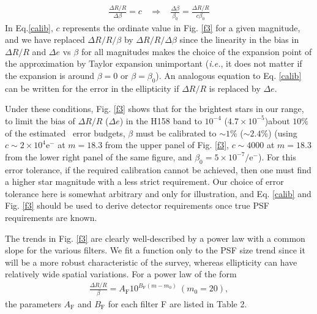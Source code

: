 \documentclass[11pt,preprint,flushrt]{aastex}
\begin{document}
\begin{align}
\frac{\Delta R/R}{\Delta \beta} = c \ \ \ \  \Rightarrow \ \ \ \ %
\frac{\Delta \beta}{\beta_0} = \frac{\Delta R/R}{c \beta_0}
\label{calib}
\end{align}
In Eq.\ref{calib}, $c$ represents the ordinate value in Fig. \ref{f3} for a given magnitude, and we have replaced $\Delta R/R/\beta$ by $\Delta R/R/ \Delta \beta$ since the linearity in the bias in $\Delta R/R$ and $\Delta e$ vs $\beta$ for all magnitudes makes the choice of the expansion point of the approximation by Taylor expansion unimportant (\emph{i.e.}, it does not matter if the expansion is around $\beta=0$ or $\beta=\beta_0$). An analogous equation to Eq. \ref{calib} can be written for the error in the ellipticity if $\Delta R/R$ is replaced by $\Delta e$. 

Under these conditions, Fig. \ref{f3} shows that for the brightest stars in our range, to limit the bias of $\Delta R/R$ ($\Delta e$) in the H158 band to $10^{-4}$  ($4.7\times 10^{-5}$)\textemdash about $10\%$ of the estimated \wf\ error budgets, $\beta$ must be calibrated to $\sim1\%$ ($\sim 2.4\%$) (using $c\sim2\times10^4 \mathrm{e^-}$ at $m=18.3$ from the upper panel of Fig. \ref{f3}, $c\sim4000$ at $m=18.3$ from the lower right panel of the same figure, and $\beta_0=5\times10^{-7}/\mathrm{e^-}$). For this error tolerance, if the required calibration cannot be achieved, then one must find a higher star magnitude with a less strict requirement.  Our choice of error tolerance here is somewhat arbitrary and only for illustration, and Eq. \ref{calib} and Fig. \ref{f3} should be used to derive detector requirements once true PSF requirements are known.

The trends in Fig. \ref{f3} are clearly well-described by a power law with a common slope for the various filters.  We fit a function only to the PSF size trend since it will be a more robust characteristic of the  survey, whereas ellipticity can have relatively wide spatial variations.  For a power law of the form
\begin{align}
\frac{\Delta R/ R}{\beta} = A_{\text{F}} 10^{B_{\text{F}} (m - m_{0})} \ (m_0 =20), 
\label{power_law}
\end{align}
the parameters $A_{\text{F}}$ and $B_{\text{F}}$ for each filter F are listed in Table 2. 
\end{document}
